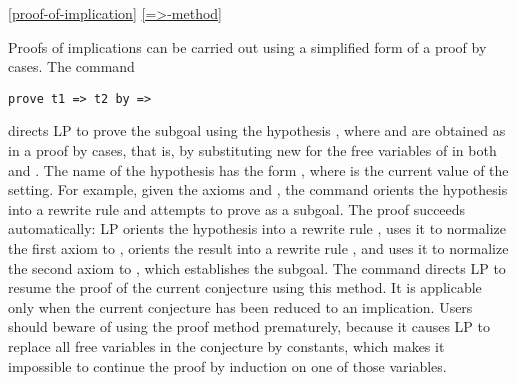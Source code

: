 \ref{proof-of-implication}
\ref{=>-method}

Proofs of implications can be carried out using a simplified form of a proof by
cases.  The command 
\begin{verbatim}
prove t1 => t2 by =>
\end{verbatim}
directs LP to prove the subgoal  using the hypothesis , where
 and  are obtained as in a proof by cases, that is, by
substituting new  for the free variables of 
in both  and .  The name of the hypothesis has the form
, where  is the current value
of the  setting.
\p
For example, given the axioms  and , the command
 orients the hypothesis  into a rewrite rule
 and attempts to prove  as a subgoal.  The proof succeeds
automatically: LP orients the hypothesis into a rewrite rule ,
uses it to normalize the first axiom to , orients the result into a
rewrite rule , and uses it to normalize the second axiom to
, which establishes the subgoal.
\p
The command  directs LP to resume the proof of the current
conjecture using this method.  It is applicable only when the current
conjecture has been reduced to an implication.
\p
Users should beware of using the \fq{=>} proof method prematurely, because it
causes LP to replace all free variables in the conjecture by constants, which
makes it impossible to continue the proof by induction on one of those
variables. 

